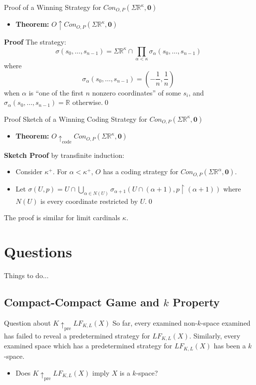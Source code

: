 \documentclass{beamer}
\newcommand{\win}{\uparrow}
\newcommand{\prewin}{\uparrow_{\text{pre}}}
\newcommand{\codewin}{\uparrow_{\text{code}}}
\newcommand{\congame}[2]{Con_{O,P}(#1,#2)}
\newcommand{\lfklgame}[1]{LF_{K,L}(#1)}
\newcommand{\sigmaprodr}[1]{\Sigma\mathbb{R}^{#1}}
\renewcommand{\vec}[1]{\mathbf{#1}}
\begin{document}
\begin{frame}{Proof of a Winning Strategy for $\congame{\sigmaprodr{\kappa}}{\vec{0}}$}
\begin{itemize}
\item \textbf{Theorem:} $O\win\congame{\sigmaprodr{\kappa}}{\vec{0}}$
\end{itemize}
\pause
\textbf{Proof} The strategy:
\[
\sigma(s_0,\dots,s_{n-1})=\sigmaprodr{\kappa}\cap\prod_{\alpha<\kappa}\sigma_\alpha(s_0,\dots,s_{n-1})
\]
\pause
where
\[
\sigma_\alpha(s_0,\dots,s_{n-1})=\left(-\frac{1}{n},\frac{1}{n}\right)
\]
when $\alpha$ is ``one of the first $n$ nonzero coordinates'' of some $s_i$, and $\sigma_\alpha(s_0,\dots,s_{n-1})=\mathbb{R}$ otherwise.\qed
\end{frame}

\begin{frame}{Proof Sketch of a Winning Coding Strategy for $\congame{\sigmaprodr{\kappa}}{\vec{0}}$}
\begin{itemize}
\item \textbf{Theorem:} $O\codewin\congame{\sigmaprodr{\kappa}}{\vec{0}}$
\end{itemize}
\pause
\textbf{Sketch Proof} by transfinite induction:
\pause
\begin{itemize}
\item Consider $\kappa^+$. For $\alpha<\kappa^+$, $O$ has a coding strategy for $\congame{\sigmaprodr{\alpha}}{\vec{0}}$.
\pause
\item Let $\sigma(U,p)=U \cap \bigcup_{\alpha\in N(U)}\sigma_{\alpha+1}(U\cap(\alpha+1),p\restriction (\alpha+1))$ where $N(U)$ is every coordinate restricted by $U$.\qed
\end{itemize}
\pause
The proof is similar for limit cardinals $\kappa$.
\end{frame}

\section{Questions}

\begin{frame}
\centerline{Things to do...}
\end{frame}

\subsection[Compact-Compact Game and $k$ Property]{Compact-Compact Game and $k$ Property}

\begin{frame}{Question about $K\prewin\lfklgame{X}$}
So far, every examined non-$k$-space examined has failed to reveal a predetermined strategy for $\lfklgame{X}$. Similarly, every examined space which has a predetermined strategy for $\lfklgame{X}$ has been a $k$-space.
\pause
\begin{itemize}
\item Does $K\prewin\lfklgame{X}$ imply $X$ is a $k$-space?
\end{itemize}
\end{frame}
\end{document}
